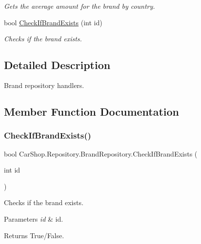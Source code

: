 \begin{DoxyCompactItemize}
\begin{DoxyCompactList}\small\item\em Gets the average amount for the brand by country. \end{DoxyCompactList}\item 
bool \mbox{\hyperlink{class_car_shop_1_1_repository_1_1_brand_repository_aa294757567b0f24fbfecaa78d86f47f8}{Check\+If\+Brand\+Exists}} (int id)
\begin{DoxyCompactList}\small\item\em Checks if the brand exists. \end{DoxyCompactList}\end{DoxyCompactItemize}


\subsection{Detailed Description}
Brand repository handlers. 



\subsection{Member Function Documentation}
\mbox{\label{class_car_shop_1_1_repository_1_1_brand_repository_aa294757567b0f24fbfecaa78d86f47f8}} 
\subsubsection{\texorpdfstring{Check\+If\+Brand\+Exists()}{CheckIfBrandExists()}}
{\footnotesize\ttfamily bool Car\+Shop.\+Repository.\+Brand\+Repository.\+Check\+If\+Brand\+Exists (\begin{DoxyParamCaption}\item[{int}]{id }\end{DoxyParamCaption})}



Checks if the brand exists. 


\begin{DoxyParams}{Parameters}
{\em id} & id.\\
\hline
\end{DoxyParams}
\begin{DoxyReturn}{Returns}
True/\+False.
\end{DoxyReturn}
\mbox{\label{class_car_shop_1_1_repository_1_1_brand_repository_a2dfc0f384a3914d6fcc3df0e2e842e4a}} 

